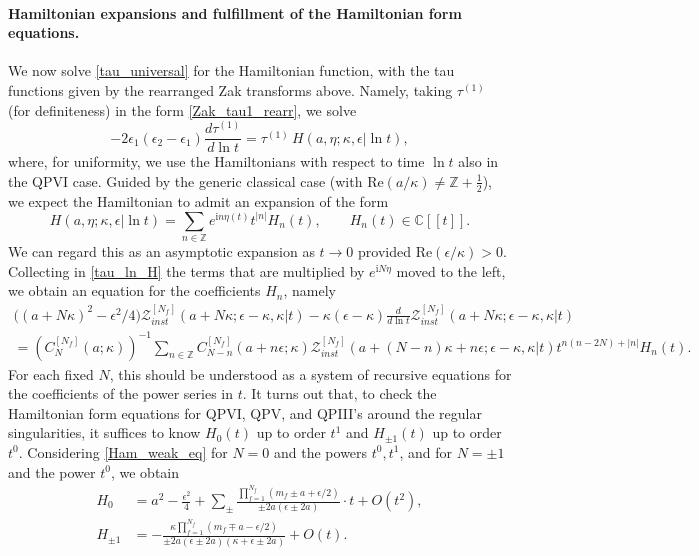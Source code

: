 \documentclass[12pt,a4paper]{article}
\numberwithin{equation}{section}
\newcommand{\ri}{\mathrm{i}}
\begin{document}
\paragraph{Hamiltonian expansions and fulfillment of the Hamiltonian form equations.}
We now solve \eqref{tau_universal} for the Hamiltonian function, with the tau functions given by the  rearranged Zak transforms above. Namely, taking $\tau^{(1)}$ (for definiteness) in the form \eqref{Zak_tau1_rearr}, we solve
\begin{equation}\label{tau_ln_H}
-2\epsilon_1(\epsilon_2{-}\epsilon_1)\frac{d\tau^{(1)}}{d\ln t}=\tau^{(1)}\,H(a,\eta;\kappa,\epsilon|\ln t),   
\end{equation}
where, for uniformity, we use the Hamiltonians with respect to time $\ln t$ also in the QPVI case. Guided by the generic classical case (with $\mathrm{Re}(a/\kappa)\neq\mathbb{Z}+\frac12$), we expect the Hamiltonian to admit an expansion of the form
\begin{equation}\label{Ham_weak_ansatz}
H(a,\eta;\kappa,\epsilon|\ln t)=\sum_{n\in\mathbb{Z}}e^{\ri n\eta(t)}t^{|n|}H_n(t),\qquad H_n(t)\in \mathbb{C}[[t]].
\end{equation}
We can regard this as an asymptotic expansion as $t\to 0$ provided $\mathrm{Re}(\epsilon/\kappa)>0$.
Collecting in \eqref{tau_ln_H} the terms that are multiplied by $e^{\ri N\eta}$ moved to the left, we obtain an equation for the coefficients $H_n$, namely
\begin{multline}\label{Ham_weak_eq}
\big((a{+}N\kappa)^2-\epsilon^2/4\big) \mathcal{Z}^{[N_f]}_{inst}(a{+}N\kappa;\epsilon{-}\kappa,\kappa|t)-\kappa(\epsilon{-}\kappa)\frac{d}{d\ln t} \mathcal{Z}^{[N_f]}_{inst}(a{+}N\kappa;\epsilon{-}\kappa,\kappa|t)\\=
\left(C_N^{[N_f]}(a;\kappa)\right)^{-1}\sum_{n\in\mathbb{Z}}C_{N-n}^{[N_f]}(a{+}n\epsilon;\kappa)\mathcal{Z}^{[N_f]}_{inst}(a{+}(N{-}n)\kappa{+}n\epsilon;\epsilon{-}\kappa,\kappa|t)t^{n(n{-}2N){+}|n|}H_n(t).
\end{multline}
For each fixed $N$, this should be understood as a system of recursive equations for the coefficients of the power series in $t$.
It turns out that, to check the Hamiltonian form equations for QPVI, QPV, and QPIII's around the regular singularities, it suffices to know $H_0(t)$ up to order $t^1$ and $H_{\pm1}(t)$ up to order $t^0$.
Considering \eqref{Ham_weak_eq} for $N=0$ and the powers $t^0, t^1$, and for $N=\pm1$ and the power $t^0$, we obtain
\begin{align}\label{H0_weak}
H_0&=a^2{-}\frac{\epsilon^2}4+\sum_{\pm}\frac{\prod_{f=1}^{N_f}(m_f\pm a+\epsilon/2)}{\pm2a(\epsilon\pm2a)}\cdot t+O(t^2),\\ \label{Hpm1_weak}
H_{\pm1}&=-\frac{\kappa\prod_{f=1}^{N_f}(m_f\mp a-\epsilon/2)}{\pm2a(\epsilon\pm2a)(\kappa+\epsilon\pm2a)}+O(t).
\end{align}
\end{document}
